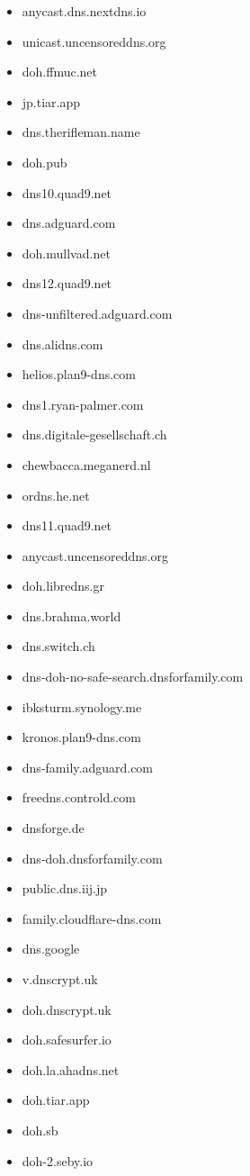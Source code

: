 \begin{small}
\begin{itemize}
\item anycast.dns.nextdns.io
\item unicast.uncensoreddns.org
\item doh.ffmuc.net
\item jp.tiar.app
\item dns.therifleman.name
\item doh.pub
\item dns10.quad9.net
\item dns.adguard.com
\item doh.mullvad.net
\item dns12.quad9.net
\item dns-unfiltered.adguard.com
\item dns.alidns.com
\item helios.plan9-dns.com
\item dns1.ryan-palmer.com
\item dns.digitale-gesellschaft.ch
\item chewbacca.meganerd.nl
\item ordns.he.net
\item dns11.quad9.net
\item anycast.uncensoreddns.org
\item doh.libredns.gr
\item dns.brahma.world
\item dns.switch.ch
\item dns-doh-no-safe-search.dnsforfamily.com
\item ibksturm.synology.me
\item kronos.plan9-dns.com
\item dns-family.adguard.com
\item freedns.controld.com
\item dnsforge.de
\item dns-doh.dnsforfamily.com
\item public.dns.iij.jp
\item family.cloudflare-dns.com
\item dns.google
\item v.dnscrypt.uk
\item doh.dnscrypt.uk
\item doh.safesurfer.io
\item doh.la.ahadns.net
\item doh.tiar.app
\item doh.sb
\item doh-2.seby.io

\end{itemize}
\end{small}
